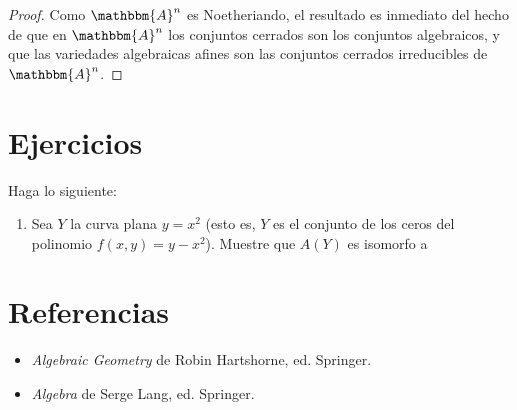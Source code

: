 \documentclass[12pt]{report}
\newcounter{it}
\theoremstyle{largebreak}
\newcommand{\bbm}[1]{\ensuremath{\mathbbm{#1}}}
\begin{document}
    \begin{proof}
        Como $\bbm{A}^n$ es Noetheriando, el resultado es inmediato del hecho de que en $\bbm{A}^n$ los conjuntos cerrados son los conjuntos algebraicos, y que las variedades algebraicas afines son las conjuntos cerrados irreducibles de $\bbm{A}^n$.
    \end{proof}

    \begin{mydef}
        
    \end{mydef}

    \newpage

    \section{Ejercicios}

    \begin{excer}
        Haga lo siguiente:
        \begin{enumerate}[label=(\textit{\alph*})]
            \item Sea $Y$ la curva plana $y=x^2$ (esto es, $Y$ es el conjunto de los ceros del polinomio $f(x,y)=y-x^2$). Muestre que $A(Y)$ es isomorfo a 
        \end{enumerate}
    \end{excer}

    \newpage

    \section{Referencias}

    \begin{itemize}
        \item \textit{Algebraic Geometry} de Robin Hartshorne, ed. Springer.
        \item \textit{Algebra} de Serge Lang, ed. Springer.
    \end{itemize}
\end{document}
